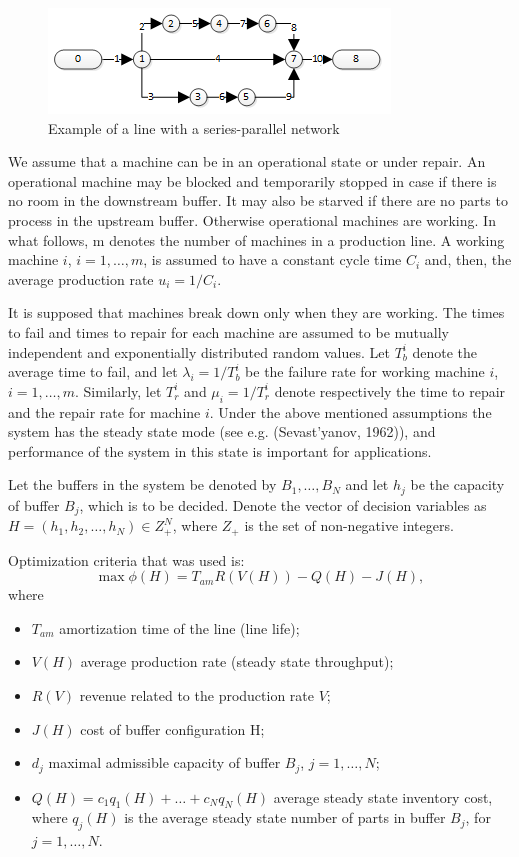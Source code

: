 \documentclass{ifacconf}
\begin{document}
 \begin{figure}[h!]
	\centering
	\includegraphics[scale=0.9]{LineSchems}
  \caption{Example of a line with a series-parallel network\label{lineexample}}
  \end{figure}

We assume that a machine can be in an operational state or under 
repair. An operational machine may be blocked and temporarily stopped in case if there 
is  no  room  in  the  downstream  buffer.  It  may  also  be  starved  if  there  are  no  parts  to 
process  in  the  upstream  buffer. Otherwise operational machines are working. In what 
follows, m denotes the number of machines in a production line. A working machine $i$, 
$i=1,…,m$, is assumed to have a constant cycle time $C_i$ and, then, the average production 
rate $u_i=1/C_i$. 

It is supposed that machines break down only when they are working. The times to fail 
and  times  to  repair  for  each  machine  are  assumed  to  be  mutually  independent  and 
exponentially distributed random values. Let $T_b^i$ denote the average time to fail, and let 
$\lambda_i=1/T_b^i$ be the failure rate for working machine $i$, $i=1,…,m$. Similarly, let $T_r^i$ and $\mu_i=1/T_r^i$  
denote  respectively  the  time  to  repair  and  the repair rate for machine $i$. Under the 
above  mentioned  assumptions  the  system  has  the  steady  state  mode  (see  e.g. 
(Sevast'yanov,  1962)),  and  performance  of  the  system  in  this  state  is  important  for 
applications.

Let the buffers in the system be denoted by $B_1,…,B_N$ and let $h_j$ be the capacity of buffer 
$B_j$,  which  is  to  be  decided.  Denote  the  vector  of  decision  variables  as  $H=  (h_1,  h_2,…, h_N )\in  Z_+^N$,  where  $Z_+$  is  the  set  of  non-negative  integers.  

Optimization criteria that was used is:
\begin{equation}
\label{criteria}
\max \phi(H)=T_{am} R(V(H)) - Q(H) - J(H),
\end{equation}
where 
\begin{itemize}
\item $T_{am}$  amortization time of the line (line life); 
\item $V(H)$  average production rate (steady state throughput); 
\item $R(V)$  revenue related to the production rate $V$; 
\item $J(H)$ cost of buffer configuration H; 
\item $d_j$ maximal admissible capacity of buffer $B_j$, $j=1,…,N$;
\item $Q(H)= c_1q_1(H)+ …+c_N q_N(H)$ average steady state inventory cost, where $q_j(H)$ is the average steady state number of parts in buffer $B_j$, for $j=1,…,N$.
\end{itemize}
\end{document}
